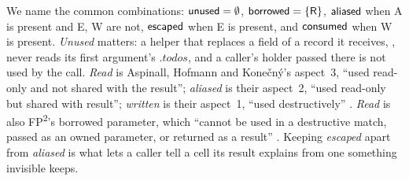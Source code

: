 We name the common combinations: $\mathsf{unused} = \emptyset$, $\mathsf{borrowed} = \{\mathsf{R}\}$, $\mathsf{aliased}$ when
\textsf{A} is present and \textsf{E}, \textsf{W} are not, $\mathsf{escaped}$ when \textsf{E} is present, and
$\mathsf{consumed}$ when \textsf{W} is present. \emph{Unused} matters: a helper that replaces a field of a
record it receives, , never reads its first
argument's $.\mathit{todos}$, and a caller's holder passed there is not used by the call. \emph{Read}
is Aspinall, Hofmann and Kone\v{c}n\'y's aspect~3, ``used read-only and not shared with the result'';
\emph{aliased} is their aspect~2, ``used read-only but shared with result''; \emph{written} is their
aspect~1, ``used destructively'' \citep[abstract]{aspinall2008usage}. \emph{Read} is also
FP\textsuperscript{2}'s borrowed parameter, which ``cannot be used in a destructive match, passed as an
owned parameter, or returned as a result'' \citep[\S1.3]{lorenzen2023fp2}. Keeping \emph{escaped}
apart from \emph{aliased} is what lets a caller tell a cell its result explains from one something
invisible keeps.

